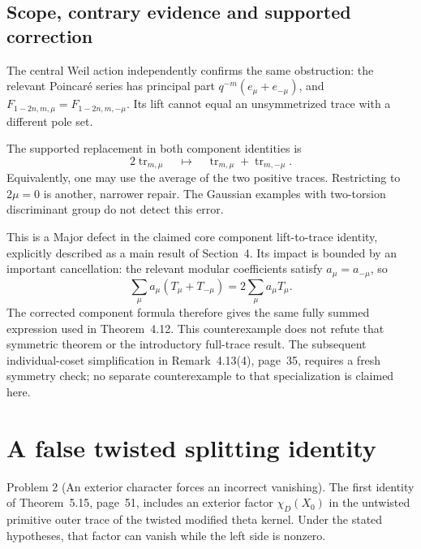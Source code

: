 \documentclass[10pt]{article}
\begin{document}
\subsection*{Scope, contrary evidence and supported correction}
The central Weil action independently confirms the same obstruction: the relevant Poincaré series has principal part \(q^{-m}(e_\mu+e_{-\mu})\), and \(F_{1-2n,m,\mu}=F_{1-2n,m,-\mu}\). Its lift cannot equal an unsymmetrized trace with a different pole set.\par
The supported replacement in both component identities is \[2\operatorname{tr}_{m,\mu}\quad\longmapsto\quad
 \operatorname{tr}_{m,\mu}+\operatorname{tr}_{m,-\mu}.\] Equivalently, one may use the average of the two positive traces. Restricting to \(2\mu=0\) is another, narrower repair. The Gaussian examples with two-torsion discriminant group do not detect this error.\par
This is a Major defect in the claimed core component lift-to-trace identity, explicitly described as a main result of Section 4. Its impact is bounded by an important cancellation: the relevant modular coefficients satisfy \(a_\mu=a_{-\mu}\), so \[\sum_\mu a_\mu(T_\mu+T_{-\mu})
       =2\sum_\mu a_\mu T_\mu .\] The corrected component formula therefore gives the same fully summed expression used in Theorem 4.12. This counterexample does not refute that symmetric theorem or the introductory full-trace result. The subsequent individual-coset simplification in Remark 4.13(4), page 35, requires a fresh symmetry check; no separate counterexample to that specialization is claimed here.\par
\section*{A false twisted splitting identity}
Problem 2 (An exterior character forces an incorrect vanishing).  The first identity of Theorem 5.15, page 51, includes an exterior factor \(\chi_D(X_0)\) in the untwisted primitive outer trace of the twisted modified theta kernel. Under the stated hypotheses, that factor can vanish while the left side is nonzero.\par
\end{document}
